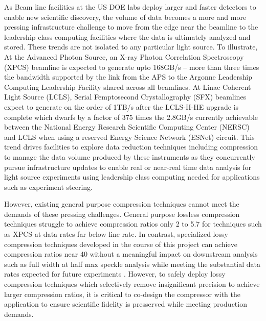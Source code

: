 As Beam line facilities at the US DOE labs deploy larger and faster detectors to enable new scientific discovery, the volume of data becomes a more and more pressing infrastructure challenge to move from the edge near the beamline to the leadership class computing facilities where the data is ultimately analyzed and stored.
These trends are not isolated to any particular light source.
To illustrate, At the Advanced Photon Source, an X-ray Photon Correlation Spectroscopy (XPCS) beamline is expected to generate upto 168GB/s \cite{nicholasschwarzetalAPSScientificComputing2024} -- more than three times the bandwidth supported by the link from the APS to the Argonne Leadership Computing Leadership Facility shared across all beamlines.
At Linac Coherent Light Source (LCLS), Serial Femptosecond Crystallography (SFX) beamlines expect to generate on the order of 1TB/s after the LCLS-II-HE upgrade is complete \cite{underwoodROIBINSZFastSciencePreserving2023} which dwarfs by a factor of 375 times the 2.8GB/s currently achievable between the National Energy Research Scientific Computing Center (NERSC) and LCLS \cite{blaschkeRealtimeXFELData2024} when using a reserved Energy Science Network (ESNet) circuit.
This trend drives facilities to explore data reduction techniques including compression to manage the data volume produced by these instruments as they concurrently pursue infrastructure updates to enable real or near-real time data analysis for light source experiments using leadership class computing needed for applications such as experiment steering.

However, existing general purpose compression techniques cannot meet the demands of these pressing challenges.
General purpose lossless compression techniques struggle to achieve compression ratios only 2 to 5.7 \cite{huangLsCOMPEfficientLight2025} for techniques such as XPCS at data rates far below line rate.
In contrast, specialized lossy compression techniques developed in the course of this project can achieve compression ratios near 40 without a meaningful impact on downstream analysis such as full width at half max speckle analysis \cite{huangLsCOMPEfficientLight2025} while meeting the substantial data rates expected for future experiments \cite{nicholasschwarzetalAPSScientificComputing2024}.
However, to safely deploy lossy compression techniques which selectively remove insignificant precision to achieve larger compression ratios, it is critical to co-design the compressor with the application to ensure scientific fidelity is presserved while meeting production demands.

